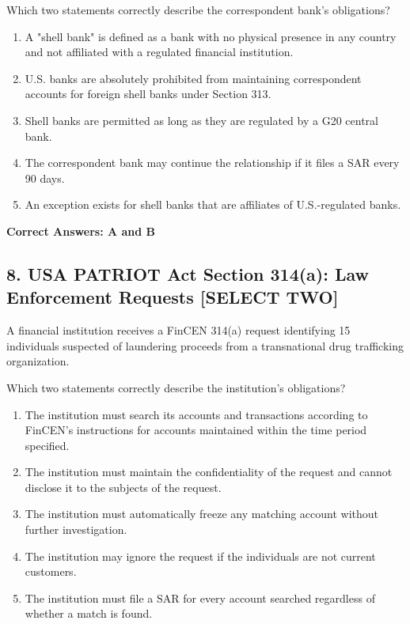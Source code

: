 \documentclass[11pt,a4paper]{article}
\begin{document}
	Which two statements correctly describe the correspondent bank's obligations?
	
	\begin{enumerate}[label=\Alph*.]
		\item A "shell bank" is defined as a bank with no physical presence in any country and not affiliated with a regulated financial institution.
		\item U.S. banks are absolutely prohibited from maintaining correspondent accounts for foreign shell banks under Section 313.
		\item Shell banks are permitted as long as they are regulated by a G20 central bank.
		\item The correspondent bank may continue the relationship if it files a SAR every 90 days.
		\item An exception exists for shell banks that are affiliates of U.S.-regulated banks.
	\end{enumerate}
	
	\textbf{Correct Answers: A and B}
	
	\subsection{8. USA PATRIOT Act Section 314(a): Law Enforcement Requests \textnormal{[SELECT TWO]}}
	
	A financial institution receives a FinCEN 314(a) request identifying 15 individuals suspected of laundering proceeds from a transnational drug trafficking organization.
	
	Which two statements correctly describe the institution's obligations?
	
	\begin{enumerate}[label=\Alph*.]
		\item The institution must search its accounts and transactions according to FinCEN's instructions for accounts maintained within the time period specified.
		\item The institution must maintain the confidentiality of the request and cannot disclose it to the subjects of the request.
		\item The institution must automatically freeze any matching account without further investigation.
		\item The institution may ignore the request if the individuals are not current customers.
		\item The institution must file a SAR for every account searched regardless of whether a match is found.
	\end{enumerate}
	
\end{document}
